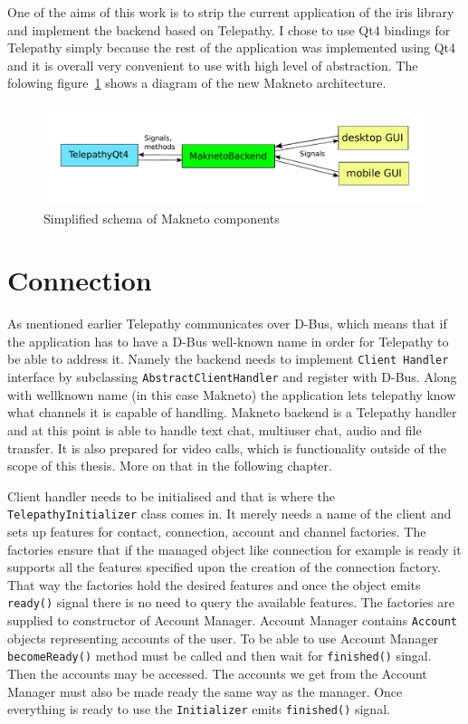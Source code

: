 One of the aims of this work is to strip the current application of the iris library and implement the backend based on Telepathy. I chose to use Qt4 bindings for Telepathy simply because the rest of the application was implemented using Qt4 and it is overall very convenient to use with high level of abstraction.	The folowing figure~\ref{fig:MaknetoArchitectureDiagram} shows a diagram of the new Makneto architecture. 

\begin{figure}[ht]
	\begin{center}
	\includegraphics[width=15cm]{fig/maknetoArchitecture}
	\caption{Simplified schema of Makneto components}
	\label{fig:MaknetoArchitectureDiagram}
\end{center}
\end{figure}

\section{Connection}
As mentioned earlier Telepathy communicates over D-Bus, which means that if the application has to have a D-Bus well-known name in order for Telepathy to be able to address it.	Namely the backend needs to implement \verb|Client Handler| interface by subclassing \verb|AbstractClientHandler| and register with D-Bus. Along with wellknown name (in this case Makneto) the application lets telepathy know what channels it is capable of handling. Makneto backend is a Telepathy handler and at this point is able to handle text chat, multiuser chat, audio and file transfer. It is also prepared for video calls, which is functionality outside of the scope of this thesis. More on that in the following chapter. 

Client handler needs to be initialised and that is where the \verb|TelepathyInitializer| class comes in. It merely needs a name of the client and sets up features for contact, connection, account and channel factories. The factories ensure that if the managed object like connection for example is ready it supports all the features specified upon the creation of the connection factory. That way the factories hold the desired features and once the object emits \verb|ready()| signal there is no need to query the available features. The factories are supplied to constructor of Account Manager. Account Manager contains \verb|Account| objects representing accounts of the user. To be able to use Account Manager \verb|becomeReady()| method must be called and then wait for \verb|finished()| singal. Then the accounts may be accessed. The accounts we get from the Account Manager must also be made ready the same way as the manager. Once everything is ready to use the \verb|Initializer| emits \verb|finished()| signal. 

